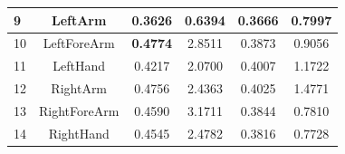 \begin{table}[ht!]
{\begin{tabular}{cc|c|c|c|c|}
\multicolumn{1}{|l|}{9}                                                       & LeftArm                                               & 0.3626                                                           & 0.6394                                                        & 0.3666                                                          & 0.7997                                                        \\ \hline
\multicolumn{1}{|l|}{10}                                                      & LeftForeArm                                           & \textbf{0.4774}                                                           & 2.8511                                                        & 0.3873                                                          & 0.9056                                                        \\ \hline
\multicolumn{1}{|l|}{11}                                                      & LeftHand                                              & 0.4217                                                           & 2.0700                                                        & 0.4007                                                          & 1.1722                                                        \\ \hline
\multicolumn{1}{|l|}{12}                                                      & RightArm                                              & 0.4756                                                           & 2.4363                                                        & 0.4025                                                          & 1.4771                                                        \\ \hline
\multicolumn{1}{|l|}{13}                                                      & RightForeArm                                          & 0.4590                                                           & 3.1711                                                        & 0.3844                                                          & 0.7810                                                        \\ \hline
\multicolumn{1}{|l|}{14}                                                      & RightHand                                             & 0.4545                                                           & 2.4782                                                        & 0.3816                                                          & 0.7728                                                        \\ \hline

\end{tabular}}
\end{table}
